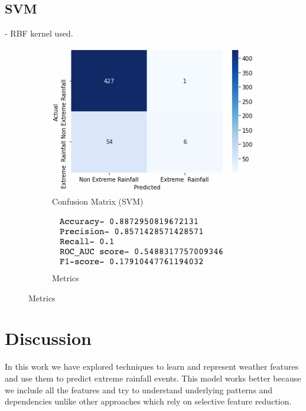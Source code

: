 \documentclass[11pt,a4paper]{article}
\begin{document}
\subsection{\textbf{SVM}} - RBF kernel used. 
\begin{figure}[!ht]
\begin{subfigure}{.5\textwidth}
\centering
\includegraphics[width=\linewidth]{svm_mumbai.png}
\caption{Confusion Matrix (SVM)}
\end{subfigure}%
\begin{subfigure}{.5\textwidth}
\centering
\includegraphics[width=.8\linewidth]{svm_metrics.png}
\caption{Metrics}
\end{subfigure}
\end{figure}
 
 \medskip
 
 \section{Discussion}
 In this work we have explored techniques to learn and represent weather features and use them to predict extreme rainfall events. This model works better because we include all the features and try to understand underlying patterns and dependencies unlike other approaches which rely on selective feature reduction.\\
\end{document}
